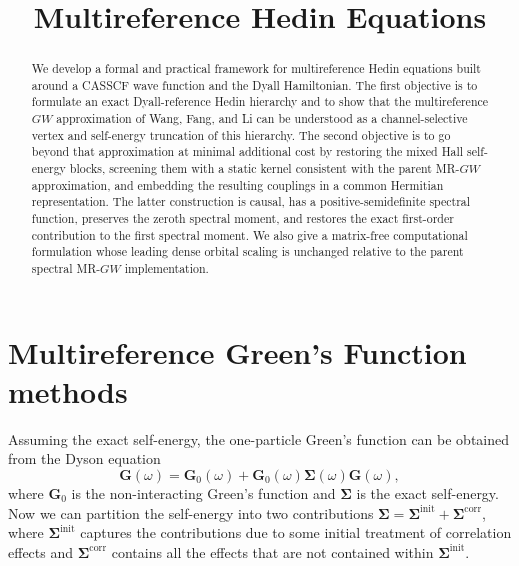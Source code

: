 \documentclass[aip,jcp,reprint,noshowkeys,superscriptaddress]{revtex4-1}
\newcommand{\bG}{\boldsymbol{G}}
\newcommand{\bSigma}{\boldsymbol{\Sigma}}
\newcommand{\LCPQ}{Laboratoire de Chimie et Physique Quantiques (UMR 5626), Universit\'e de Toulouse, CNRS, UPS, France}
\begin{document}
\title{Multireference Hedin Equations}


\begin{abstract}
We develop a formal and practical framework for multireference Hedin equations
built around a CASSCF wave function and the Dyall Hamiltonian.  The first
objective is to formulate an exact Dyall-reference Hedin hierarchy and to show
that the multireference $GW$ approximation of Wang, Fang, and Li can be
understood as a channel-selective vertex and self-energy truncation of this
hierarchy.  The second objective is to go beyond that approximation at minimal
additional cost by restoring the mixed Hall self-energy blocks, screening them
with a static kernel consistent with the parent MR-$GW$ approximation, and
embedding the resulting couplings in a common Hermitian representation.  The
latter construction is causal, has a positive-semidefinite spectral function,
preserves the zeroth spectral moment, and restores the exact first-order
contribution to the first spectral moment.  We also give a matrix-free
computational formulation whose leading dense orbital scaling is unchanged
relative to the parent spectral MR-$GW$ implementation.
\end{abstract}

\maketitle


\section{Multireference Green's Function methods}

Assuming the exact self-energy, the one-particle Green's function can be obtained from the Dyson equation
\begin{equation}
\bG(\omega) = \bG_0(\omega) + \bG_0(\omega) \bSigma(\omega) \bG(\omega),
\end{equation}
where $\bG_0$ is the non-interacting Green's function and $\bSigma$ is the exact self-energy.
Now we can partition the self-energy into two contributions $\bSigma = \bSigma^{\text{init}} + \bSigma^{\text{corr}}$, where $\bSigma^{\text{init}}$ captures the contributions due to some initial treatment of correlation effects and $\bSigma^{\text{corr}}$ contains all the effects that are not contained within $\bSigma^{\text{init}}$.
\end{document}

